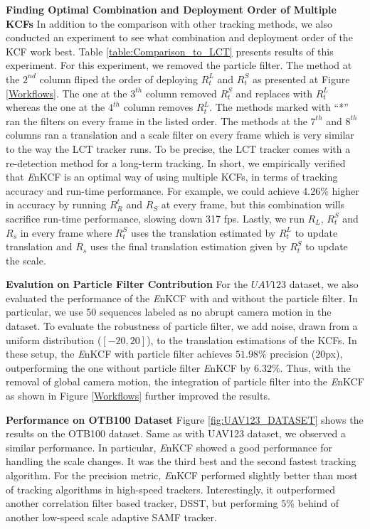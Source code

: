 \documentclass[10pt,twocolumn,letterpaper]{article}
\begin{document}
\textbf{Finding Optimal Combination and Deployment Order of Multiple
  KCFs} In addition to the comparison with other tracking methods, we
also conducted an experiment to see what combination and deployment
order of the KCF work best. Table \ref{table:Comparison_to_LCT}
presents results of this experiment. For this experiment, we removed
the particle filter. The method at the $2^{nd}$ column fliped the
order of deploying $R_{t}^{L}$ and $R_{t}^{S}$ as presented at Figure
\ref{Workflows}. The one at the $3^{th}$ column removed $R_{t}^{S}$
and replaces with $R_{t}^{L}$ whereas the one at the $4^{th}$ column
removes $R_{t}^{L}$. The methods marked with ``*'' ran the filters on
every frame in the listed order. The methods at the $7^{th}$ and
$8^{th}$ columns ran a translation and a scale filter on every frame
which is very similar to the way the LCT tracker \cite{ma2015long}
runs. To be precise, the LCT tracker comes with a re-detection method
for a long-term tracking. In short, we empirically verified that
\textit{E}nKCF is an optimal way of using multiple KCFs, in terms of
tracking accuracy and run-time performance. For example, we could
achieve 4.26\% higher in accuracy by running $R_{R}^{t}$ and $R_{S}$
at every frame, but this combination wills sacrifice run-time
performance, slowing down 317 fps. Lastly, we run $R_{L}$, $R_{t}^{S}$
and $R_{s}$ in every frame where $R_{t}^{S}$ uses the translation
estimated by $R_{t}^{L}$ to update translation and $R_{s}$ uses the
final translation estimation given by $R_{t}^{S}$ to update the scale.

\textbf{Evalution on Particle Filter Contribution} For the $UAV123$ dataset, we also evaluated the performance of the
{\it E}nKCF with and without the particle filter. In particular, we
use 50 sequences labeled as no abrupt camera motion in the dataset. To
evaluate the robustness of particle filter, we add noise, drawn from a
uniform distribution ($[-20,20]$), to the translation estimations of
the KCFs. In these setup, the {\it E}nKCF with particle filter
achieves $51.98\%$ precision ($20$px), outperforming the one without
particle filter {\it E}nKCF by $6.32\%$. Thus, with the removal of
global camera motion, the integration of particle filter into the {\it
  E}nKCF as shown in Figure \ref{Workflows} further improved the
results.

\textbf{Performance on OTB100 Dataset} Figure \ref{fig:UAV123_DATASET}
shows the results on the OTB100 dataset. Same as with UAV123 dataset,
we observed a similar performance. In particular, {\it E}nKCF showed a
good performance for handling the scale changes. It was the third best
and the second fastest tracking algorithm. For the precision metric,
{\it E}nKCF performed slightly better than most of tracking algorithms
in high-speed trackers. Interestingly, it outperformed another
correlation filter based tracker, DSST, but performing $5\%$ behind of
another low-speed scale adaptive SAMF tracker.
\end{document}
